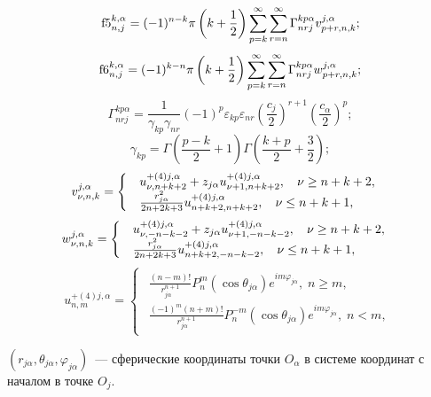 \begin{theorem}
\[{\rm{f5}}_{n,j}^{k,\alpha } = (-1)^{n-k}\pi \left( {k + \frac{1}{2}} \right)\sum\limits_{p = k}^\infty  {\sum\limits_{r = n}^\infty  {\Gamma _{nrj}^{kp\alpha }v_{p + r,n,k}^{j,\alpha }} };\]
\[{\rm{f6}}_{n,j}^{k,\alpha } = (-1)^{k-n}\pi \left( {k + \frac{1}{2}} \right)\sum\limits_{p = k}^\infty  {\sum\limits_{r = n}^\infty  {\Gamma _{nrj}^{kp\alpha }w_{p + r,n,k}^{j,\alpha }} };\]
\[\Gamma _{nrj}^{kp\alpha } = \frac{1}{{{\gamma _{kp}}{\gamma _{nr}}}}{( - 1)^{p}}{\varepsilon _{kp}}{\varepsilon _{nr}}{\left( {\frac{{{{{c}}_j}}}{2}} \right)^{r + 1}}{\left( {\frac{{{{{c}}_\alpha }}}{2}} \right)^p};\]
\[{\gamma _{kp}} = \Gamma \left( {\frac{{p - k}}{2} + 1} \right)\Gamma \left( {\frac{{k + p}}{2} + \frac{3}{2}} \right);\]
\[v_{\nu ,n,k}^{j,\alpha } = \left\{ {\begin{array}{*{20}{l}}
\begin{array}{l}
u_{\nu ,n + k + 2}^{ + (4)j,\alpha } + {z_{j\alpha }}u_{\nu  + 1,n + k + 2}^{ + (4)j,\alpha },\;\;\;{\kern 1pt} \nu  \ge n + k + 2,\\
\frac{{r_{j\alpha }^2}}{{2n + 2k + 3}}u_{n + k + 2,n + k + 2}^{ + (4)j,\alpha },\;\;\;{\kern 1pt} \nu  \le n + k + 1,
\end{array}
\end{array}} \right.\]
\[w_{\nu ,n,k}^{j,\alpha } = \left\{ {\begin{array}{*{20}{l}}
\begin{array}{l}
u_{\nu , - n - k - 2}^{ + (4)j,\alpha } + {z_{j\alpha }}u_{\nu  + 1, - n - k - 2}^{ + (4)j,\alpha },\;\;\;{\kern 1pt} \nu  \ge n + k + 2,\\
\frac{{r_{j\alpha }^2}}{{2n + 2k + 3}}u_{n + k + 2, - n - k - 2}^{ + (4)j,\alpha },\;\;\;{\kern 1pt} \nu  \le n + k + 1,
\end{array}
\end{array}} \right.\]
\[{{u}}_{n,m}^{ + (4)j,\alpha } = \left\{ {\begin{array}{*{20}{l}}
\begin{array}{l}
\frac{{(n - m)!}}{{r_{j\alpha }^{n + 1}}}P_n^m(\cos {\theta _{j\alpha }}){e^{im{\varphi _{j\alpha }}}},\;n \ge m,\\
\frac{{{{( - 1)}^m}(n + m)!}}{{r_{j\alpha }^{n + 1}}}P_n^{ - m}(\cos {\theta _{j\alpha }}){e^{im{\varphi _{j\alpha }}}},\;n < m,
\end{array}
\end{array}} \right.\]

\noindent $(r_{j\alpha},\theta_{j\alpha},\varphi_{j\alpha})$~--- сферические координаты точки $O_\alpha$ в системе координат с началом в точке $O_j$.
\end{theorem}

